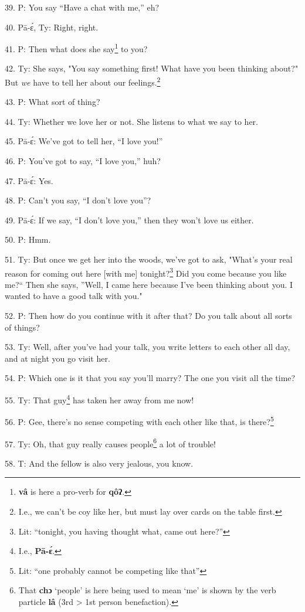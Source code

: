39. P: You say ``Have a chat with me,'' eh?

40. Pā-ɛ́, Ty: Right, right.

41. P: Then what does she say\footnote{\textbf{vâ} is here a pro-verb for \textbf{qôʔ}.} to you?

42. Ty: She says, "You say something first! What have you been thinking
about?" But \textit{we} have to tell her about our feelings.\footnote{I.e., we can't be coy like her, but must lay over cards on the table first.}

43. P: What sort of thing?

44. Ty: Whether we love her or not. She listens to what we say to her.

45. Pā-ɛ́: We've got to tell her, ``I love you!''

46. P: You've got to say, ``I love you,'' huh?

47. Pā-ɛ́: Yes.

48. P: Can't you say, ``I don't love you''?

49. Pā-ɛ́: If we say, ``I don't love you,'' then they won't
love us either.

50. P: Hmm.

51. Ty: But once we get her into the woods, we've got to ask, "What's
your real reason for coming out here [with me] tonight?\footnote{Lit: ``tonight, you having thought what, came out here?''} Did you come because
you like me?`` Then she says, ''Well, I came here because I've
been thinking about you. I wanted to have a good talk with you."

52. P: Then how do you continue with it after that? Do you talk about all
sorts of things?

53. Ty: Well, after you've had your talk, you write letters to each other
all day, and at night you go visit her.

54. P: Which one is it that you say you'll marry? The one you visit all
the time?

55. Ty: That guy\footnote{I.e., \textbf{Pā-ɛ́}.} has taken her away from me now!

56. P: Gee, there's no sense competing with each other like that, is there?\footnote{Lit: ``one probably cannot be competing like that''}

57. Ty: Oh, that guy really causes people\footnote{That \textbf{chɔ} `people' is here being used to mean `me' is shown by the verb particle \textbf{lâ} (3rd > 1st person benefaction).} a lot of trouble!

58. T: And the fellow is also very jealous, you know.

